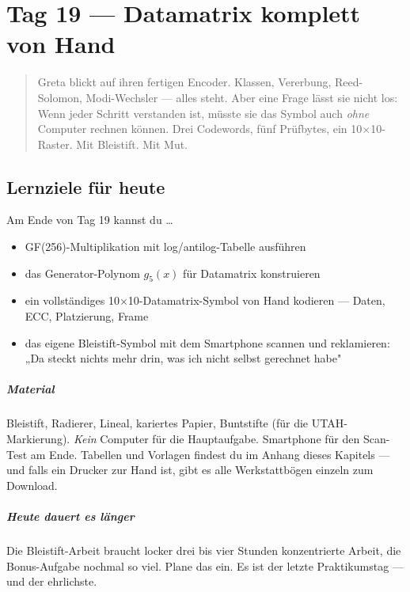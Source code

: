 \chapter{Tag 19 — Datamatrix komplett von Hand}

\begin{quote}
Greta blickt auf ihren fertigen Encoder. Klassen, Vererbung,
Reed-Solomon, Modi-Wechsler — alles steht. Aber eine Frage lässt sie
nicht los: Wenn jeder Schritt verstanden ist, müsste sie das Symbol
auch \emph{ohne} Computer rechnen können. Drei Codewords, fünf
Prüfbytes, ein 10×10-Raster. Mit Bleistift. Mit Mut.
\end{quote}

\section*{Lernziele für heute}

Am Ende von Tag 19 kannst du \dots

\begin{itemize}
\item GF(256)-Multiplikation mit log/antilog-Tabelle ausführen
\item das Generator-Polynom $g_5(x)$ für Datamatrix konstruieren
\item ein vollständiges 10×10-Datamatrix-Symbol von Hand kodieren —
  Daten, ECC, Platzierung, Frame
\item das eigene Bleistift-Symbol mit dem Smartphone scannen und
  reklamieren: „Da steckt nichts mehr drin, was ich nicht selbst
  gerechnet habe"
\end{itemize}

\paragraph{Material} Bleistift, Radierer, Lineal, kariertes Papier,
Buntstifte (für die UTAH-Markierung). \emph{Kein} Computer für die
Hauptaufgabe. Smartphone für den Scan-Test am Ende. Tabellen und
Vorlagen findest du im Anhang dieses Kapitels — und falls ein Drucker
zur Hand ist, gibt es alle Werkstattbögen einzeln zum Download.

\paragraph{Heute dauert es länger} Die Bleistift-Arbeit braucht
locker drei bis vier Stunden konzentrierte Arbeit, die Bonus-Aufgabe
nochmal so viel. Plane das ein. Es ist der letzte Praktikumstag —
und der ehrlichste.

